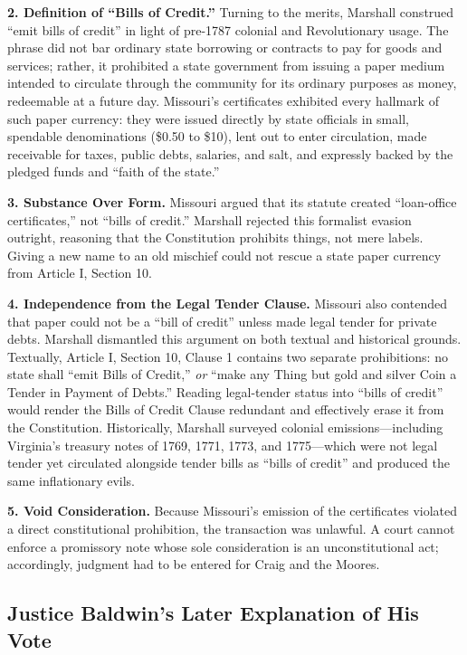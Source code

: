 \documentclass[12pt]{article}
\begin{document}
\textbf{2. Definition of ``Bills of Credit.''} Turning to the merits, Marshall construed ``emit bills of credit'' in light of pre-1787 colonial and Revolutionary usage. The phrase did not bar ordinary state borrowing or contracts to pay for goods and services; rather, it prohibited a state government from issuing a paper medium intended to circulate through the community for its ordinary purposes as money, redeemable at a future day. Missouri's certificates exhibited every hallmark of such paper currency: they were issued directly by state officials in small, spendable denominations (\$0.50 to \$10), lent out to enter circulation, made receivable for taxes, public debts, salaries, and salt, and expressly backed by the pledged funds and ``faith of the state.''

\textbf{3. Substance Over Form.} Missouri argued that its statute created ``loan-office certificates,'' not ``bills of credit.'' Marshall rejected this formalist evasion outright, reasoning that the Constitution prohibits things, not mere labels. Giving a new name to an old mischief could not rescue a state paper currency from Article I, Section 10.

\textbf{4. Independence from the Legal Tender Clause.} Missouri also contended that paper could not be a ``bill of credit'' unless made legal tender for private debts. Marshall dismantled this argument on both textual and historical grounds. Textually, Article I, Section 10, Clause 1 contains two separate prohibitions: no state shall ``emit Bills of Credit,'' \textit{or} ``make any Thing but gold and silver Coin a Tender in Payment of Debts.'' Reading legal-tender status into ``bills of credit'' would render the Bills of Credit Clause redundant and effectively erase it from the Constitution. Historically, Marshall surveyed colonial emissions---including Virginia's treasury notes of 1769, 1771, 1773, and 1775---which were not legal tender yet circulated alongside tender bills as ``bills of credit'' and produced the same inflationary evils.

\textbf{5. Void Consideration.} Because Missouri's emission of the certificates violated a direct constitutional prohibition, the transaction was unlawful. A court cannot enforce a promissory note whose sole consideration is an unconstitutional act; accordingly, judgment had to be entered for Craig and the Moores.

\subsection{Justice Baldwin's Later Explanation of His Vote}
\end{document}
